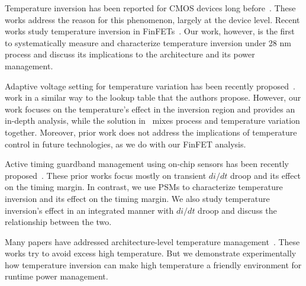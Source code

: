 Temperature inversion has been reported for CMOS devices long before~\cite{park1995reversal,bellaouar1998supply,dasdan2006handling,wolpert2012temperature}. These works address the reason for this phenomenon, largely at the device level. Recent works study temperature inversion in FinFETs~\cite{lee2014dynamic,cai2015tei}. Our work, however, is the first to systematically measure and characterize temperature inversion under 28 nm process and discuss its implications to the architecture and its power management. 

Adaptive voltage setting for temperature variation has been recently proposed~\cite{sriram2016avfs}. \tistates work in a similar way to the lookup table that the authors propose. However, our work focuses on the temperature's effect in the inversion region and provides an in-depth analysis, while the solution in~\cite{sriram2016avfs} mixes process and temperature variation together. Moreover, prior work does not address the implications of temperature control in future technologies, as we do with our FinFET analysis.

Active timing guardband management using on-chip sensors has been recently proposed~\cite{lefurgy2011active,zu2015adaptive}. These prior works focus mostly on transient $di/dt$ droop and its effect on the timing margin. In contrast, we use PSMs to characterize temperature inversion and its effect on the timing margin. We also study temperature inversion's effect in an integrated manner with $di/dt$ droop and discuss the relationship between the two.

Many papers have addressed architecture-level temperature management~\cite{skadron2004temperature,huang2006hotspot,fan2016computational,raghavan2012computational}. These works try to avoid excess high temperature. But we demonstrate experimentally how temperature inversion can make high temperature a friendly environment for runtime power management.

